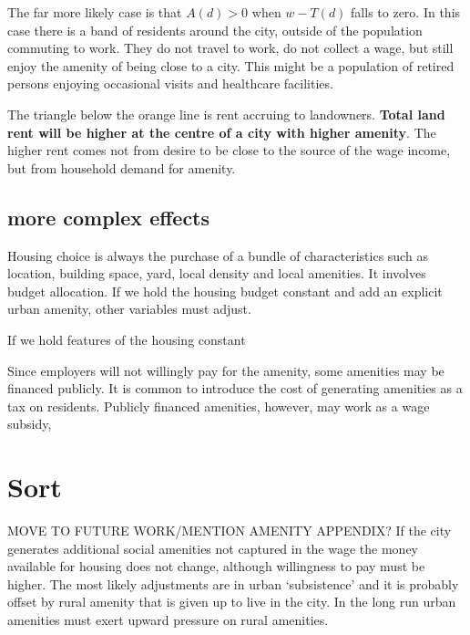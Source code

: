 The far more likely case is that $A(d) > 0$ when $w-T(d)$ falls to zero. In this case there is a band of  residents around the city, outside of the population commuting to work. They do not travel to work,  do not collect a wage, but still enjoy the amenity of being close to a city. This might be a population of retired persons enjoying occasional visits and healthcare facilities.

The triangle below the orange line is rent accruing to landowners. \textbf{Total land rent will be higher at the centre of a city with higher amenity}. The  higher rent comes not from desire to be close to the source of the wage income, but from household demand for amenity.  

\subsection{more complex effects}
Housing choice is always the purchase of  a bundle of characteristics such as location, building space, yard, local density and local amenities. It involves budget allocation. If we hold the housing budget constant and add an explicit urban amenity, other variables must adjust. 

If we hold features of the housing constant 
  
Since employers will not willingly pay for the amenity, some amenities may be financed publicly. It is common to introduce the cost of generating amenities as a tax on residents. Publicly financed amenities, however, may work as a wage subsidy,   
    
   


\section{Sort}
{MOVE TO FUTURE WORK/MENTION AMENITY APPENDIX? If the city generates additional social amenities not captured in the wage  the money available for housing does not change, although willingness to pay must be higher. The most likely adjustments are in urban `subsistence' and it is probably offset by rural amenity that is given up to live in the city. In the long run urban amenities must exert upward pressure on rural amenities.} %




